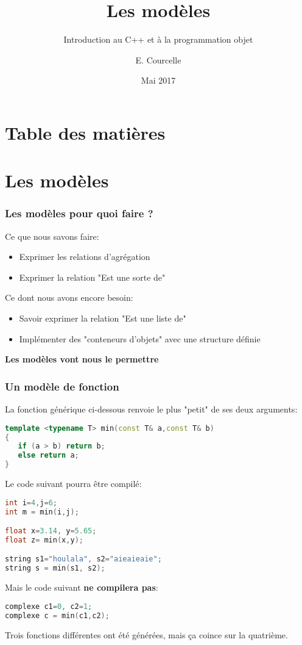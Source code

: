 \documentclass{beamer}
\title{Les modèles}
\subtitle{Introduction au C++ et à la programmation objet}
\author{E. Courcelle}\institute{CALMIP, UMS 3669}
\date{Mai 2017}
\begin{document}
\begin{frame}
\titlepage
\end{frame}

\section*{Table des matières}
\begin{frame}
\tableofcontents
\end{frame}


\section{Les modèles}

\begin{frame}[fragile=singleslide,shrink=20]
\frametitle {Les modèles pour quoi faire ?}

Ce que nous savons faire:
\begin{itemize}
\item{Exprimer les relations d'agrégation}
\item{Exprimer la relation "Est une sorte de"}
\end{itemize}

Ce dont nous avons encore besoin:
\begin{itemize}
\item{Savoir exprimer la relation "Est une liste de"}
\item{Implémenter des "conteneurs d'objets" avec une structure définie}
\end{itemize}

\textbf{Les modèles vont nous le permettre}
\end{frame}

\begin{frame}[fragile=singleslide,shrink=20]
\frametitle {Un modèle de fonction}

La fonction générique ci-dessous renvoie le plus "petit" de ses deux arguments:
\begin{lstlisting}[language=c++]
template <typename T> min(const T& a,const T& b)
{
   if (a > b) return b;
   else return a;
}
\end{lstlisting}

Le code suivant pourra être compilé:
\begin{lstlisting}[language=c++]
int i=4,j=6;
int m = min(i,j);

float x=3.14, y=5.65;
float z= min(x,y);

string s1="houlala", s2="aieaieaie";
string s = min(s1, s2);
\end{lstlisting}

Mais le code suivant \textbf{ne compilera pas}:
\begin{lstlisting}[language=c++]
complexe c1=0, c2=1;
complexe c = min(c1,c2);
\end{lstlisting}

Trois fonctions différentes ont été générées, mais ça coince sur la quatrième.
\end{frame}
\end{document}
